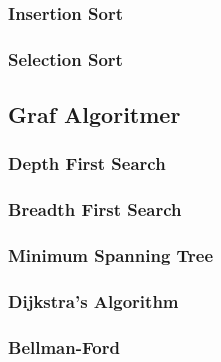 \documentclass{article}
\begin{document}
    \subsubsection{Insertion Sort}
    \subsubsection{Selection Sort}
    \subsection{Graf Algoritmer}
    \subsubsection{Depth First Search}
    \subsubsection{Breadth First Search}
    \subsubsection{Minimum Spanning Tree}
    \subsubsection{Dijkstra's Algorithm}
    \subsubsection{Bellman-Ford}
\end{document}
